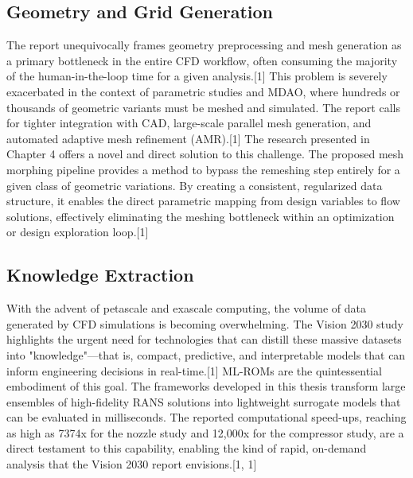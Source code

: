 \documentclass[12pt, a4paper]{report}
\begin{document}
\subsection{Geometry and Grid Generation}
The report unequivocally frames geometry preprocessing and mesh generation as a primary bottleneck in the entire CFD workflow, often consuming the majority of the human-in-the-loop time for a given analysis.[1] This problem is severely exacerbated in the context of parametric studies and MDAO, where hundreds or thousands of geometric variants must be meshed and simulated. The report calls for tighter integration with CAD, large-scale parallel mesh generation, and automated adaptive mesh refinement (AMR).[1] The research presented in Chapter 4 offers a novel and direct solution to this challenge. The proposed mesh morphing pipeline provides a method to bypass the remeshing step entirely for a given class of geometric variations. By creating a consistent, regularized data structure, it enables the direct parametric mapping from design variables to flow solutions, effectively eliminating the meshing bottleneck within an optimization or design exploration loop.[1]

\subsection{Knowledge Extraction}
With the advent of petascale and exascale computing, the volume of data generated by CFD simulations is becoming overwhelming. The Vision 2030 study highlights the urgent need for technologies that can distill these massive datasets into "knowledge"—that is, compact, predictive, and interpretable models that can inform engineering decisions in real-time.[1] ML-ROMs are the quintessential embodiment of this goal. The frameworks developed in this thesis transform large ensembles of high-fidelity RANS solutions into lightweight surrogate models that can be evaluated in milliseconds. The reported computational speed-ups, reaching as high as 7374x for the nozzle study and 12,000x for the compressor study, are a direct testament to this capability, enabling the kind of rapid, on-demand analysis that the Vision 2030 report envisions.[1, 1]
\end{document}
